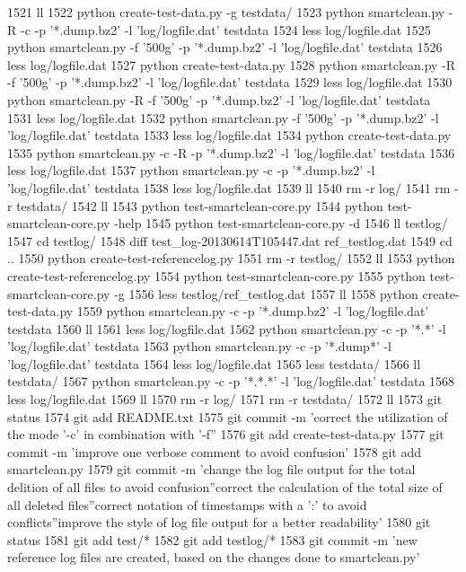  1521  ll
 1522  python create-test-data.py -g testdata/
 1523  python smartclean.py -R -c -p '*.dump.bz2' -l 'log/logfile.dat' testdata
 1524  less log/logfile.dat 
 1525  python smartclean.py -f '500g' -p '*.dump.bz2' -l 'log/logfile.dat' testdata
 1526  less log/logfile.dat 
 1527  python create-test-data.py
 1528  python smartclean.py -R -f '500g' -p '*.dump.bz2' -l 'log/logfile.dat' testdata
 1529  less log/logfile.dat 
 1530  python smartclean.py -R -f '500g' -p '*.dump.bz2' -l 'log/logfile.dat' testdata
 1531  less log/logfile.dat 
 1532  python smartclean.py -f '500g' -p '*.dump.bz2' -l 'log/logfile.dat' testdata
 1533  less log/logfile.dat 
 1534  python create-test-data.py
 1535  python smartclean.py -c -R -p '*.dump.bz2' -l 'log/logfile.dat' testdata
 1536  less log/logfile.dat 
 1537  python smartclean.py -c -p '*.dump.bz2' -l 'log/logfile.dat' testdata
 1538  less log/logfile.dat 
 1539  ll
 1540  rm -r log/
 1541  rm -r testdata/
 1542  ll
 1543  python test-smartclean-core.py 
 1544  python test-smartclean-core.py -help
 1545  python test-smartclean-core.py -d
 1546  ll testlog/
 1547  cd testlog/
 1548  diff test_log-20130614T105447.dat ref_testlog.dat 
 1549  cd ..
 1550  python create-test-referencelog.py 
 1551  rm -r testlog/
 1552  ll
 1553  python create-test-referencelog.py 
 1554  python test-smartclean-core.py
 1555  python test-smartclean-core.py -g
 1556  less testlog/ref_testlog.dat 
 1557  ll
 1558  python create-test-data.py 
 1559  python smartclean.py -c -p '*.dump.bz2' -l 'log/logfile.dat' testdata
 1560  ll
 1561  less log/logfile.dat 
 1562  python smartclean.py -c -p '*.*' -l 'log/logfile.dat' testdata
 1563  python smartclean.py -c -p '*.dump*' -l 'log/logfile.dat' testdata
 1564  less log/logfile.dat 
 1565  less testdata/
 1566  ll testdata/
 1567  python smartclean.py -c -p '*.*.*' -l 'log/logfile.dat' testdata
 1568  less log/logfile.dat 
 1569  ll
 1570  rm -r log/
 1571  rm -r testdata/
 1572  ll
 1573  git status
 1574  git add README.txt
 1575  git commit -m 'correct the utilization of the mode '-c' in combination with '-f''
 1576  git add create-test-data.py
 1577  git commit -m 'improve one verbose comment to avoid confusion'
 1578  git add smartclean.py
 1579  git commit -m 'change the log file output for the total delition of all files to avoid confusion''correct the calculation of the total size of all deleted files''correct notation of timestamps with a ':' to avoid conflicts''improve the style of log file output for a better readability'
 1580  git status
 1581  git add test/*
 1582  git add testlog/*
 1583  git commit -m 'new reference log files are created, based on the changes done to smartclean.py'
